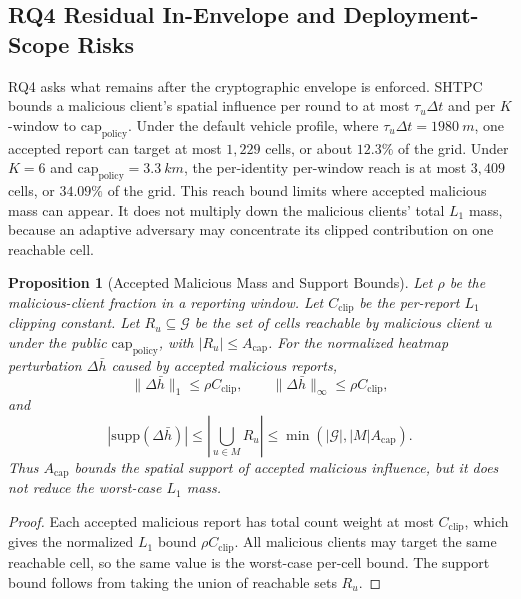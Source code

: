 \documentclass[journal]{IEEEtran}
\theoremstyle{definition}
\theoremstyle{plain}
\newtheorem{proposition}{Proposition}
\begin{document}
\subsection{RQ4 Residual In-Envelope and Deployment-Scope Risks}
\label{sec:eval-reach}

RQ4 asks what remains after the cryptographic envelope is enforced.
\textsc{SHTPC} bounds a malicious client's spatial influence per round to at most
$\tau_u\Delta t$ and per $K$-window to $\mathrm{cap}_{\mathrm{policy}}$. Under
the default vehicle profile, where $\tau_u\Delta t=\SI{1980}{m}$, one accepted
report can target at most $1{,}229$ cells, or about $12.3\%$ of the grid. Under
$K{=}6$ and $\mathrm{cap}_{\mathrm{policy}}=\SI{3.3}{km}$, the per-identity
per-window reach is at most $3{,}409$ cells, or $34.09\%$ of the grid.
This reach bound limits where accepted malicious mass can appear. It does not
multiply down the malicious clients' total \(L_1\) mass, because an adaptive adversary may
concentrate its clipped contribution on one reachable cell.

\begin{proposition}[Accepted Malicious Mass and Support Bounds]
  \label{prop:bounded-influence}
  Let \(\rho\) be the malicious-client fraction in a reporting window. Let
  \(C_{\mathrm{clip}}\) be the per-report \(L_1\) clipping constant. Let
  \(R_u\subseteq\mathcal{G}\) be the set of cells reachable by malicious client
  \(u\) under the public \(\mathrm{cap}_{\mathrm{policy}}\), with
  \(|R_u|\le A_{\mathrm{cap}}\). For the normalized heatmap perturbation
  \(\Delta\bar h\) caused by accepted malicious reports,
  \[
    \|\Delta\bar h\|_1\le\rho C_{\mathrm{clip}},
    \qquad
    \|\Delta\bar h\|_\infty\le\rho C_{\mathrm{clip}},
  \]
  and
  \[
    |\mathrm{supp}(\Delta\bar h)|
    \le
    \left|\bigcup_{u\in M}R_u\right|
    \le
    \min(|\mathcal{G}|,|M|A_{\mathrm{cap}}).
  \]
  Thus \(A_{\mathrm{cap}}\) bounds the spatial support of accepted malicious
  influence, but it does not reduce the worst-case \(L_1\) mass.
\end{proposition}
\begin{proof}
  Each accepted malicious report has total count weight at most
  \(C_{\mathrm{clip}}\), which gives the normalized \(L_1\) bound
  \(\rho C_{\mathrm{clip}}\). All malicious clients may target the same
  reachable cell, so the same value is the worst-case per-cell bound. The
  support bound follows from taking the union of reachable sets \(R_u\).
\end{proof}
\end{document}
